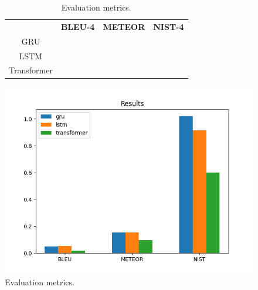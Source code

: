 \documentclass[12pt]{article}
\theoremstyle{plain}
\theoremstyle{definition}
\theoremstyle{remark}
\begin{document}
\begin{figure}[H]
    \centering
    \begin{minipage}{0.4\textwidth}
        \begin{table}[H]
            \centering
            \fontsize{8}{10}\selectfont
            \begin{tabular}{c|c|c|c}
                & \textbf{BLEU-4} & \textbf{METEOR} & \textbf{NIST-4} \\
                GRU & & & \\
                LSTM & & & \\
                Transformer & & &
            \end{tabular}
            \caption{Evaluation metrics.}\label{tab:results}
        \end{table}
    \end{minipage}
    \hfill
    \begin{minipage}{0.5\textwidth}
        \centering
        \includegraphics[width=.9\textwidth]{res/metrics.png}
        \caption{Evaluation metrics.}\label{fig:results}
    \end{minipage}
\end{figure}
\end{document}
